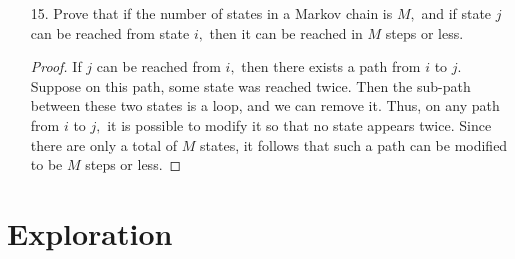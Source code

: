 \documentclass{article}
\begin{document}
\begin{itemize}
\begin{enumerate}[(a)]
		\end{enumerate}
		
	\item[15.] Prove that if the number of states in a Markov chain is $M,$ and if state $j$ can be reached from state $i,$ then it can be reached in $M$ steps or less.
		\begin{proof}
			If $j$ can be reached from $i,$ then there exists a path from $i$ to $j.$ Suppose on this path, some state was reached twice. Then the sub-path between these two states is a loop, and we can remove it. Thus, on any path from $i$ to $j,$ it is possible to modify it so that no state appears twice. Since there are only a total of $M$ states, it follows that such a path can be modified to be $M$ steps or less.
		\end{proof}
		
\end{itemize}

\section*{Exploration}
\end{document}
